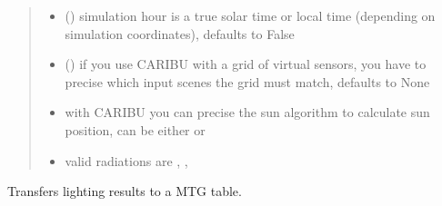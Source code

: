 \documentclass[letterpaper,10pt,english]{sphinxmanual}
\begin{document}
\begin{fulllineitems}
\begin{fulllineitems}
\begin{quote}
\begin{description}
\begin{itemize}
\item {} 
\sphinxAtStartPar
{} (\sphinxstyleliteralemphasis{\sphinxupquote{, }}) \textendash{} simulation hour is a true solar time or local time (depending on simulation coordinates), defaults to False

\item {} 
\sphinxAtStartPar
{} (\sphinxstyleliteralemphasis{\sphinxupquote{, }}) \textendash{} if you use CARIBU with a grid of virtual sensors, you have to precise which input scenes the grid must match, defaults to None

\end{itemize}

\begin{itemize}
\item {} 
\sphinxAtStartPar
{} \textendash{} with CARIBU you can precise the sun algorithm to calculate sun position, can be either  or 

\item {} 
\sphinxAtStartPar
{} \textendash{} valid radiations are , , 

\end{itemize}

\end{description}\end{quote}

\end{fulllineitems}


\begin{fulllineitems}
\label{\detokenize{reference:LVM.LightVegeManager.to_MTG}}
\pysigstartsignatures
{}
\pysigstopsignatures
\sphinxAtStartPar
Transfers lighting results to a MTG table.


\end{fulllineitems}
\end{fulllineitems}
\end{document}
